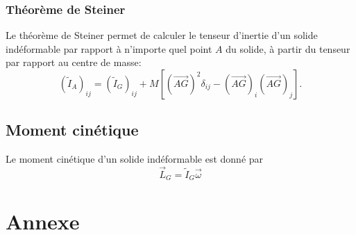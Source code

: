 \documentclass{article}
\begin{document}
\subsubsection{Théorème de Steiner}
Le théorème de Steiner permet de calculer le tenseur d'inertie d'un solide indéformable par rapport à n'importe quel point $A$ du solide, à partir du tenseur par rapport au centre de masse:
\begin{equation}
	(\tilde I_A)_{ij} = (\tilde I_G)_{ij} + M\left[ (\overrightarrow{AG})^2 \delta_{ij} - (\overrightarrow{AG})_i(\overrightarrow{AG})_j \right].
\end{equation}

\subsection{Moment cinétique}
Le moment cinétique d'un solide indéformable est donné par
\begin{equation}
	\vec L_G = \tilde I_G \vec \omega
\end{equation}

\pagebreak
\section{Annexe}
\end{document}
